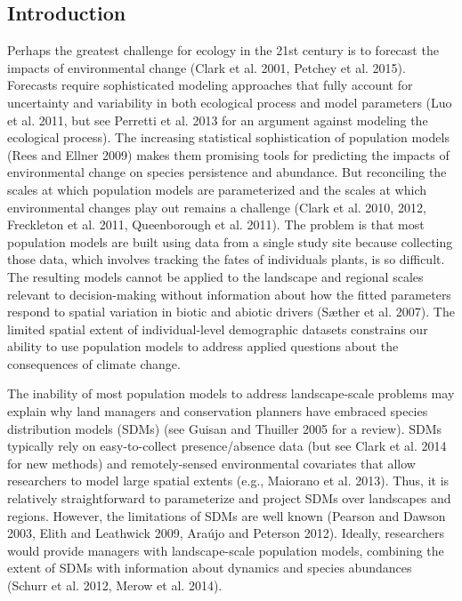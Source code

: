 \documentclass[12pt,]{article}
\begin{document}
\newpage{}

\subsection{Introduction}\label{introduction}

Perhaps the greatest challenge for ecology in the 21st century is to
forecast the impacts of environmental change (Clark et al. 2001, Petchey
et al. 2015). Forecasts require sophisticated modeling approaches that
fully account for uncertainty and variability in both ecological process
and model parameters (Luo et al. 2011, but see Perretti et al. 2013 for
an argument against modeling the ecological process). The increasing
statistical sophistication of population models (Rees and Ellner 2009)
makes them promising tools for predicting the impacts of environmental
change on species persistence and abundance. But reconciling the scales
at which population models are parameterized and the scales at which
environmental changes play out remains a challenge (Clark et al. 2010,
2012, Freckleton et al. 2011, Queenborough et al. 2011). The problem is
that most population models are built using data from a single study
site because collecting those data, which involves tracking the fates of
individuals plants, is so difficult. The resulting models cannot be
applied to the landscape and regional scales relevant to decision-making
without information about how the fitted parameters respond to spatial
variation in biotic and abiotic drivers (S{æ}ther et al. 2007). The
limited spatial extent of individual-level demographic datasets
constrains our ability to use population models to address applied
questions about the consequences of climate change.

The inability of most population models to address landscape-scale
problems may explain why land managers and conservation planners have
embraced species distribution models (SDMs) (see Guisan and Thuiller
2005 for a review). SDMs typically rely on easy-to-collect
presence/absence data (but see Clark et al. 2014 for new methods) and
remotely-sensed environmental covariates that allow researchers to model
large spatial extents (e.g., Maiorano et al. 2013). Thus, it is
relatively straightforward to parameterize and project SDMs over
landscapes and regions. However, the limitations of SDMs are well known
(Pearson and Dawson 2003, Elith and Leathwick 2009, Ara{ú}jo and
Peterson 2012). Ideally, researchers would provide managers with
landscape-scale population models, combining the extent of SDMs with
information about dynamics and species abundances (Schurr et al. 2012,
Merow et al. 2014).
\end{document}
